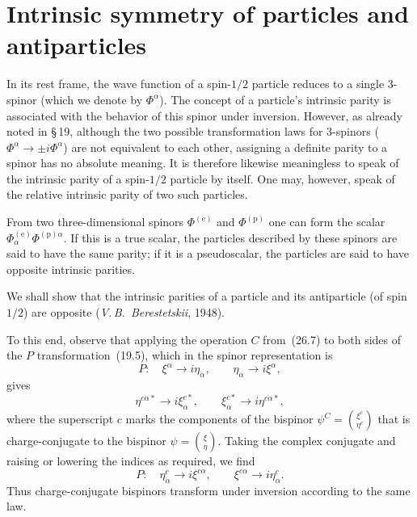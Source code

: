 \section{Intrinsic symmetry of particles and antiparticles}

In its rest frame, the wave function of a spin-$1/2$ particle reduces to a single 3-spinor (which we denote by $\Phi^\alpha$). The concept of a particle's intrinsic parity is associated with the behavior of this spinor under inversion. However, as already noted in \S\,19, although the two possible transformation laws for 3-spinors ($\Phi^\alpha \to \pm i\Phi^\alpha$) are not equivalent to each other, assigning a definite parity to a spinor has no absolute meaning. It is therefore likewise meaningless to speak of the intrinsic parity of a spin-$1/2$ particle by itself. One may, however, speak of the relative intrinsic parity of two such particles.

From two three-dimensional spinors $\Phi^{(\text{e})}$ and $\Phi^{(\text{p})}$ one can form the scalar $\Phi_\alpha^{(\text{e})}\Phi^{(\text{p})\alpha}$. If this is a true scalar, the particles described by these spinors are said to have the same parity; if it is a pseudoscalar, the particles are said to have opposite intrinsic parities.

We shall show that the intrinsic parities of a particle and its antiparticle (of spin $1/2$) are opposite (\emph{V.\,B.~Berestetskii}, 1948).

To this end, observe that applying the operation $C$ from~(26.7) to both sides of the $P$ transformation~(19.5), which in the spinor representation is
\begin{equation}
P:\quad \xi^\alpha \to i\eta_{\dot\alpha},\qquad \eta_{\dot\alpha} \to i\xi^\alpha,
\tag{27.1}
\end{equation}
gives
\[
\eta^{c\dot\alpha*} \to i\xi^{c*}_{\alpha},\qquad \xi^{c*}_\alpha \to i\eta^{c\dot\alpha*},
\]
where the superscript $c$ marks the components of the bispinor $\psi^C = \binom{\xi^c}{\eta^c}$ that is charge-conjugate to the bispinor $\psi = \binom{\xi}{\eta}$. Taking the complex conjugate and raising or lowering the indices as required, we find
\begin{equation}
P:\quad \eta^c_{\dot\alpha} \to i\xi^{c\alpha},\qquad \xi^{c\alpha} \to i\eta^c_{\dot\alpha}.
\tag{27.2}
\end{equation}
Thus charge-conjugate bispinors transform under inversion according to the same law.

